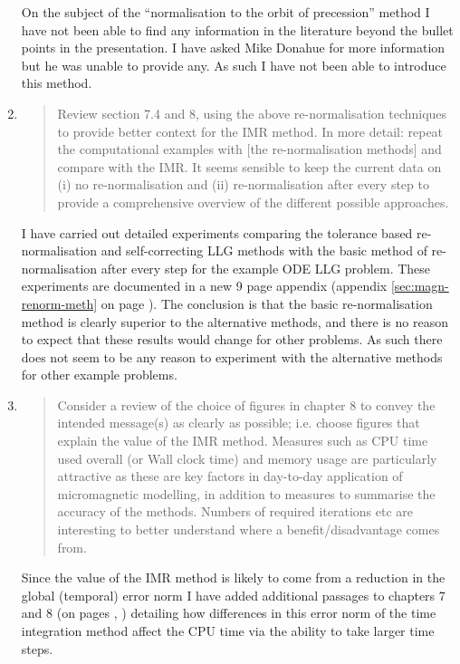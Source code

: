 \documentclass[12pt,a4paper,pdftex]{article}
\begin{document}
\begin{enumerate}
  On the subject of the ``normalisation to the orbit of precession'' method I have not been able to find any information in the literature beyond the bullet points in the presentation.
  I have asked Mike Donahue for more information but he was unable to provide any.
  As such I have not been able to introduce this method.

\item
  \begin{quotation}
    Review section 7.4 and 8, using the above re-normalisation techniques
    to provide better context for the IMR method. In more detail: repeat
    the computational examples with [the re-normalisation methods] and compare with the IMR.
    It seems sensible to keep the current data on (i) no re-normalisation
    and (ii) re-normalisation after every step to provide a comprehensive
    overview of the different possible approaches.
  \end{quotation}
  I have carried out detailed experiments comparing the tolerance based re-normalisation and self-correcting LLG methods with the basic method of re-normalisation after every step for the example ODE LLG problem.
  These experiments are documented in a new 9 page appendix (appendix \ref{sec:magn-renorm-meth} on page \pageref{sec:magn-renorm-meth}).
  The conclusion is that the basic re-normalisation method is clearly superior to the alternative methods, and there is no reason to expect that these results would change for other problems.
  As such there does not seem to be any reason to experiment with the alternative methods for other example problems.

\item
  \begin{quotation}
    Consider a review of the choice of figures in chapter 8 to convey
    the intended message(s) as clearly as possible; i.e. choose figures
    that explain the value of the IMR method. Measures such as CPU time
    used overall (or Wall clock time) and memory usage are particularly
    attractive as these are key factors in day-to-day application of
    micromagnetic modelling, in addition to measures to summarise the
    accuracy of the methods. Numbers of required iterations etc are
    interesting to better understand where a benefit/disadvantage comes
    from.
  \end{quotation}
  Since the value of the IMR method is likely to come from a reduction in the global (temporal) error norm I have added additional passages to chapters 7 and 8 (on pages \pageref{cpu-correction-1}, \pageref{cpu-correction-2}) detailing how differences in this error norm of the time integration method affect the CPU time via the ability to take larger time steps.


\end{enumerate}
\end{document}

